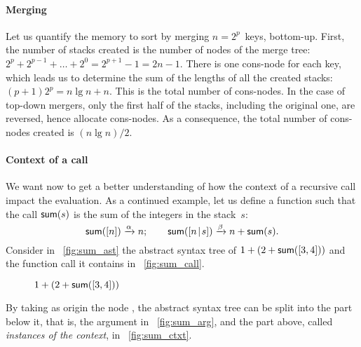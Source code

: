 \paragraph{Merging}

Let us quantify the memory to sort by merging \(n=2^p\)~keys,
bottom\hyp{}up. First, the number of stacks created is the number of
nodes of the merge tree: \(2^p + 2^{p-1} + \ldots + 2^0 = 2^{p+1}-1 =
2n - 1\). There is one cons\hyp{}node for each key,
which leads us to determine the sum of the lengths of all the created
stacks: \((p+1)2^p = n\lg n + n\). This is the total number of
cons\hyp{}nodes. In the case of top\hyp{}down
mergers, only the first half of the stacks, including the original
one, are reversed, hence allocate cons\hyp{}nodes. As a consequence,
the total number of cons\hyp{}nodes created is \((n\lg n)/2\).

\paragraph{Context of a call}

We want now to get a better understanding of how the context of a
recursive call impact the evaluation. As a continued example, let us
define a function  such that the call \(\textsf{sum}(s)\) is
the sum of the integers in the stack~\(s\):
\begin{equation*}
\textsf{sum}([n]) \xrightarrow{\smash{\alpha}} n;\qquad
\textsf{sum}([{n}\!\mid\!{s}]) \xrightarrow{\smash{\beta}} n + \textsf{sum}(s).
\end{equation*}
Consider in \fig~\vref{fig:sum_ast} the abstract syntax tree of
\(1+(2+\textsf{sum}([3,4]))\) and the function call it contains in
\fig~\ref{fig:sum_call}.
\begin{figure}[b]
\centering
{}
\qquad
{}
\quad
{}
\qquad
{}
\caption{\(1+(2+\textsf{sum}([3,4]))\)}
\end{figure}
By taking as origin the node , the abstract syntax tree can
be split into the part below it, that is, the argument in
\fig~\ref{fig:sum_arg}, and the part above, called \emph{instances of
  the context}, in \fig~\ref{fig:sum_ctxt}.

